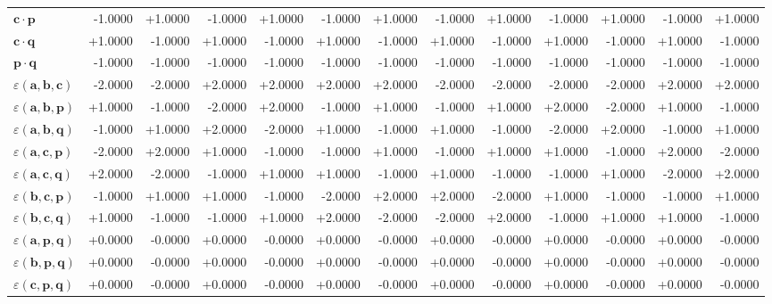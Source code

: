 \documentclass[a4paper,11pt]{article}
\newcommand{\pdcegfomjfhook}[2]{\mathbf{#1} \cdot \mathbf{#2}}
\newcommand{\kblbmcpggoncpf}[3]{\varepsilon(\mathbf{#1},\mathbf{#2},\mathbf{#3})}
\begin{document}
\begin{table}[h]
\begin{tabular}{lrrrrrrrrrrrr}
$\pdcegfomjfhook{c}{p}$ & -1.0000 & +1.0000 & -1.0000 & +1.0000 & -1.0000 & +1.0000 & -1.0000 & +1.0000 & -1.0000 & +1.0000 & -1.0000 & +1.0000 \\
$\pdcegfomjfhook{c}{q}$ & +1.0000 & -1.0000 & +1.0000 & -1.0000 & +1.0000 & -1.0000 & +1.0000 & -1.0000 & +1.0000 & -1.0000 & +1.0000 & -1.0000 \\
$\pdcegfomjfhook{p}{q}$ & -1.0000 & -1.0000 & -1.0000 & -1.0000 & -1.0000 & -1.0000 & -1.0000 & -1.0000 & -1.0000 & -1.0000 & -1.0000 & -1.0000 \\
$\kblbmcpggoncpf{a}{b}{c}$ & -2.0000 & -2.0000 & +2.0000 & +2.0000 & +2.0000 & +2.0000 & -2.0000 & -2.0000 & -2.0000 & -2.0000 & +2.0000 & +2.0000 \\
$\kblbmcpggoncpf{a}{b}{p}$ & +1.0000 & -1.0000 & -2.0000 & +2.0000 & -1.0000 & +1.0000 & -1.0000 & +1.0000 & +2.0000 & -2.0000 & +1.0000 & -1.0000 \\
$\kblbmcpggoncpf{a}{b}{q}$ & -1.0000 & +1.0000 & +2.0000 & -2.0000 & +1.0000 & -1.0000 & +1.0000 & -1.0000 & -2.0000 & +2.0000 & -1.0000 & +1.0000 \\
$\kblbmcpggoncpf{a}{c}{p}$ & -2.0000 & +2.0000 & +1.0000 & -1.0000 & -1.0000 & +1.0000 & -1.0000 & +1.0000 & +1.0000 & -1.0000 & +2.0000 & -2.0000 \\
$\kblbmcpggoncpf{a}{c}{q}$ & +2.0000 & -2.0000 & -1.0000 & +1.0000 & +1.0000 & -1.0000 & +1.0000 & -1.0000 & -1.0000 & +1.0000 & -2.0000 & +2.0000 \\
$\kblbmcpggoncpf{b}{c}{p}$ & -1.0000 & +1.0000 & +1.0000 & -1.0000 & -2.0000 & +2.0000 & +2.0000 & -2.0000 & +1.0000 & -1.0000 & -1.0000 & +1.0000 \\
$\kblbmcpggoncpf{b}{c}{q}$ & +1.0000 & -1.0000 & -1.0000 & +1.0000 & +2.0000 & -2.0000 & -2.0000 & +2.0000 & -1.0000 & +1.0000 & +1.0000 & -1.0000 \\
$\kblbmcpggoncpf{a}{p}{q}$ & +0.0000 & -0.0000 & +0.0000 & -0.0000 & +0.0000 & -0.0000 & +0.0000 & -0.0000 & +0.0000 & -0.0000 & +0.0000 & -0.0000 \\
$\kblbmcpggoncpf{b}{p}{q}$ & +0.0000 & -0.0000 & +0.0000 & -0.0000 & +0.0000 & -0.0000 & +0.0000 & -0.0000 & +0.0000 & -0.0000 & +0.0000 & -0.0000 \\
$\kblbmcpggoncpf{c}{p}{q}$ & +0.0000 & -0.0000 & +0.0000 & -0.0000 & +0.0000 & -0.0000 & +0.0000 & -0.0000 & +0.0000 & -0.0000 & +0.0000 & -0.0000 \\
\bottomrule\end{tabular}\end{table}
\end{document}
